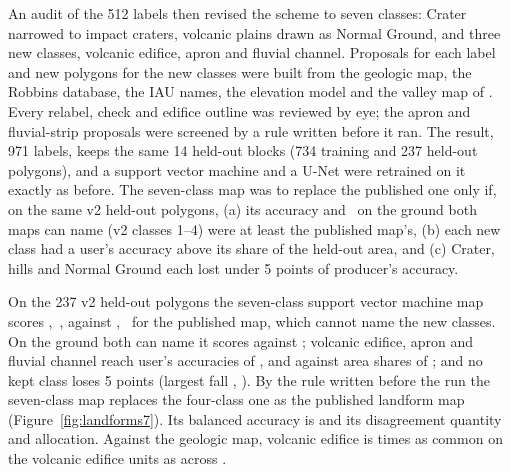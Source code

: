 An audit of the 512 labels then revised the scheme to seven classes: Crater narrowed to impact craters, volcanic
plains drawn as Normal Ground, and three new classes, volcanic edifice, apron and fluvial channel. Proposals for each
label and new polygons for the new classes were built from the geologic map, the Robbins database, the IAU names, the
elevation model and the valley map of \citet{Alemanno2018}. Every relabel, check and edifice outline was reviewed by
eye; the apron and fluvial-strip proposals were screened by a rule written before it ran. The result, 971 labels, keeps
the same 14 held-out blocks (734 training and 237 held-out polygons), and a support vector machine and a U-Net were
retrained on it exactly as before. The seven-class map was to replace the published one only if, on the same v2
held-out polygons, (a) its accuracy and \kap\ on the ground both maps can name (v2 classes 1--4) were at least the
published map's, (b) each new class had a user's accuracy above its share of the held-out area, and (c) Crater, hills
and Normal Ground each lost under 5 points of producer's accuracy. %

On the 237 v2 held-out polygons the seven-class support vector machine map scores ,
\kap\,, against , \kap\, for the published
map, which cannot name the new classes. On the ground both can name it scores  against
; volcanic edifice, apron and fluvial channel reach user's accuracies of
,  and  against area shares
of ; and no kept class loses 5 points (largest fall , ).
By the rule written before the run the seven-class map replaces the four-class one as the published landform map
(Figure~\ref{fig:landforms7}). Its balanced accuracy is  and its disagreement
 quantity and  allocation. Against the geologic map, volcanic edifice is
 times as common on the volcanic edifice units as across \pmsixty.


